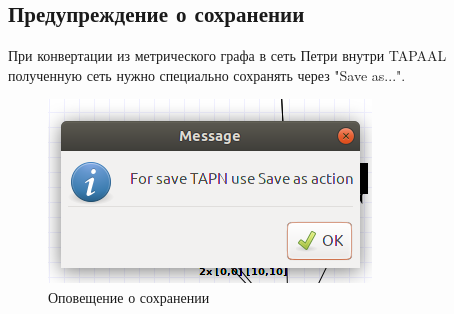 \documentclass{../TechDoc}
\begin{document}
		\subsection{Предупреждение о сохранении}
		При конвертации из метрического графа в сеть Петри внутри TAPAAL полученную сеть нужно специально сохранять через "Save as...".
		\begin{figure}[h!]
			\centering
			\includegraphics[width=0.7\linewidth]{save}
			\caption{Оповещение о сохранении}
			\label{fig:save}
		\end{figure}
		\registrationList
		
\end{document}
